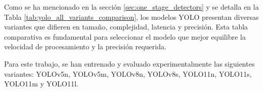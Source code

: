 \documentclass[11pt,spanish,listoffigures,listoftables]{tfgetsinf}
\begin{document}
Como se ha mencionado en la sección \ref{sec:one_stage_detectors} y se detalla en la Tabla \ref{tab:yolo_all_variants_comparison}, los modelos YOLO presentan diversas variantes que difieren en tamaño, complejidad, latencia y precisión. Esta tabla comparativa es fundamental para seleccionar el modelo que mejor equilibre la velocidad de procesamiento y la precisión requerida.

Para este trabajo, se han entrenado y evaluado experimentalmente las siguientes variantes: YOLOv5n, YOLOv5m, YOLOv8n, YOLOv8s, YOLO11n, YOLO11s, YOLO11m y YOLO11l.




\begin{table}[H]
   \centering
   \caption[Análisis comparativo de variantes de YOLO (v5, v8, v11) indicando tamaño, parámetros, latencias CPU/GPU y la GPU específica utilizada para la medición de latencia GPU]{Análisis comparativo de variantes de YOLO (v5, v8, v11) indicando tamaño, parámetros, latencias CPU/GPU y la GPU específica utilizada para la medición de latencia GPU.}
   \label{tab:yolo_all_variants_comparison}
\end{table}
\end{document}

